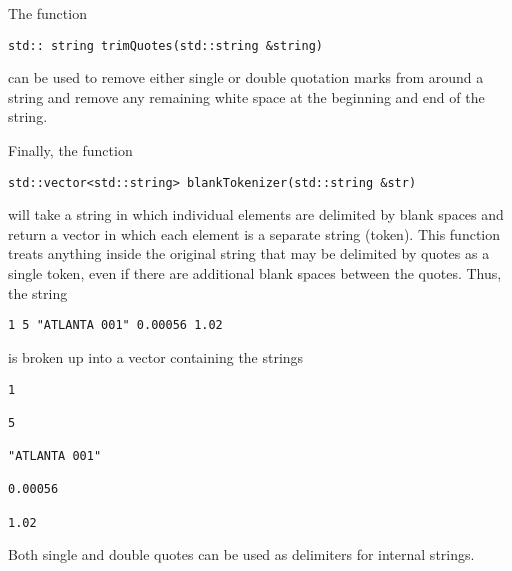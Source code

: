 The function

{
\color{red}
\begin{Verbatim}[fontseries=b]
std:: string trimQuotes(std::string &string)
\end{Verbatim}
}

can be used to remove either single or double quotation marks from around a string and remove any remaining white space at the beginning and end of the string.

Finally, the function

{
\color{red}
\begin{Verbatim}[fontseries=b]
std::vector<std::string> blankTokenizer(std::string &str)
\end{Verbatim}
}

will take a string in which individual elements are delimited by blank spaces and return a vector in which each element is a separate string (token). This function treats anything inside the original string that may be delimited by quotes as a single token, even if there are additional blank spaces between the quotes. Thus, the string

{
\color{red}
\begin{Verbatim}[fontseries=b]
1 5 "ATLANTA 001" 0.00056 1.02
\end{Verbatim}
}

is broken up into a vector containing the strings


{
\color{red}
\begin{Verbatim}[fontseries=b]
1

5

"ATLANTA 001"

0.00056

1.02
\end{Verbatim}
}

Both single and double quotes can be used as delimiters for internal strings.
